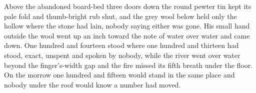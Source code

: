 Above the abandoned board-bed three doors down the round pewter tin kept its pale fold and thumb-bright rub shut, and the grey wool below held only the hollow where the stone had lain, nobody saying either was gone. His small hand outside the wool went up an inch toward the note of water over water and came down. One hundred and fourteen stood where one hundred and thirteen had stood, exact, unspent and spoken by nobody, while the river went over water beyond the finger's-width gap and the fire missed its fifth breath under the floor. On the morrow one hundred and fifteen would stand in the same place and nobody under the roof would know a number had moved.
